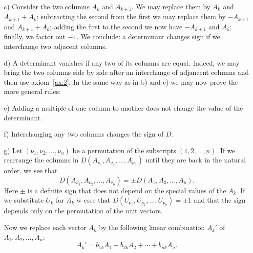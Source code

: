 \documentclass[10pt,leqno]{article}
\theoremstyle{definition}
\begin{document}
c) Consider the two columns $A_k$ and $A_{k+1}$.
We may replace them by $A_{k}$ and $A_{k+1} + A_k$; subtracting the second from the first we may replace them by $-A_{k+1}$ and $A_{k+1} + A_k$; adding the first to the second we now have $-A_{k+1}$ and $A_k$; finally, we factor out $-1$.
We conclude: a determinant changes sign if we interchange two adjacent columns.

d) A determinant vanishes if any two of its columns are equal.
Indeed, we may bring the two columns side by side after an interchange of adjancent columns and then use axiom~\ref{ax:2}.
In the same way as in b) and c) we may now prove the more general rules:

e) Adding a multiple of one column to another does not change the value of the determinant.

f) Interchanging any two columns changes the sign of $D$.

g) Let $(\nu_1, \nu_2, \ldots, \nu_n)$ be a permutation of the subscripts $(1,2,\ldots,n)$.
If we rearrange the columns in $D(A_{\nu_1}, A_{\nu_2}, \ldots, A_{\nu_n})$ until they are back in the natural order, we see that
\[
D(A_{\nu_1}, A_{\nu_2}, \ldots, A_{\nu_n})
= \pm D(A_1, A_2, \ldots, A_n).
\]
Here $\pm$ is a definite sign that does not depend on the special values of the $A_k$.
If we substitute $U_k$ for $A_k$ w esee that $D(U_{\nu_1}, U_{\nu_2}, \ldots, U_{\nu_n}) = \pm 1$ and that the sign depends only on the permutation of the unit vectors.

Now we replace each vector $A_k$ by the following linear combination $A_k'$ of $A_1, A_2, \ldots, A_n$:
\begin{equation}
\label{eq:1F6}
A_k' = b_{1k} A_1 + b_{2k} A_2 + \cdots + b_{nk} A_n.
\end{equation}
\end{document}
